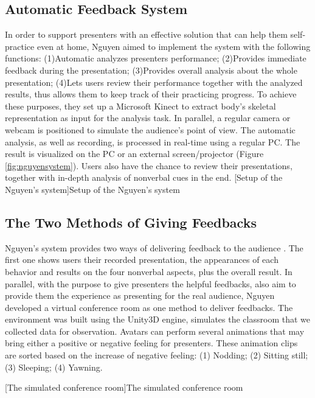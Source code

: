 \subsection*{Automatic Feedback System}
\par In order to support presenters with an effective solution that can help them self-practice even at home, Nguyen aimed to implement the system with the following functions: (1)Automatic analyzes presenters performance; (2)Provides immediate feedback during the presentation; (3)Provides overall analysis about the whole presentation; (4)Lets users review their performance together with the analyzed results, thus allows them to keep track of their practicing progress. To achieve these purposes, they set up a Microsoft Kinect to extract body's skeletal representation as input for the analysis task. In parallel, a regular camera or webcam is positioned to simulate the audience's point of view. The automatic analysis, as well as recording,  is processed in real-time using a regular PC. The result is visualized on the PC or an external screen/projector (Figure \ref{fig:nguyensystem}). Users also have the chance to review their presentations, together with in-depth analysis of nonverbal cues in the end.
[Setup of the Nguyen's system]{Setup of the Nguyen's system \cite{nguyen2015intelligent}}

\subsection*{The Two Methods of Giving Feedbacks}
\par Nguyen's system provides two ways of delivering feedback to the audience \cite{nguyen2015intelligent}. The first one shows users their recorded presentation, the appearances of each behavior and results on the four nonverbal aspects, plus the overall result. In parallel, with the purpose to give presenters the helpful feedbacks, also aim to provide them the experience as presenting for the real audience, Nguyen developed a virtual conference room as one method to deliver feedbacks. The environment was built using the Unity3D engine, simulates the classroom that we collected data for observation. Avatars can perform several animations that may bring either a positive or negative feeling for presenters. These animation clips are sorted based on the increase of negative feeling: (1) Nodding; (2) Sitting still; (3) Sleeping; (4) Yawning.


[The simulated conference room]{The simulated conference room \cite{nguyen2015intelligent}}

